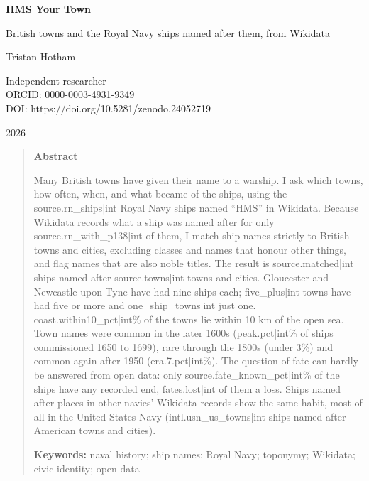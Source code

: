 \documentclass[11pt,a4paper]{article}
\begin{document}
\begin{center}
{\Large\bfseries HMS Your Town\par}
\vspace{0.4em}
{\large British towns and the Royal Navy ships named after them, from Wikidata\par}
\vspace{1.2em}
{\large Tristan Hotham\par}
\vspace{0.3em}
{\small Independent researcher\\
ORCID: 0000-0003-4931-9349\\
DOI: https://doi.org/10.5281/zenodo.24052719\par}
\vspace{0.8em}
2026
\end{center}

\begin{quote}
\small
\begin{center}\textbf{Abstract}\end{center}
Many British towns have given their name to a warship. I ask which towns, how often, when, and what became of the ships, using the {{source.rn_ships|int}} Royal Navy ships named ``HMS'' in Wikidata. Because Wikidata records what a ship was named after for only {{source.rn_with_p138|int}} of them, I match ship names strictly to British towns and cities, excluding classes and names that honour other things, and flag names that are also noble titles. The result is {{source.matched|int}} ships named after {{source.towns|int}} towns and cities. Gloucester and Newcastle upon Tyne have had nine ships each; {{five_plus|int}} towns have had five or more and {{one_ship_towns|int}} just one. {{coast.within10_pct|int}}\% of the towns lie within 10 km of the open sea. Town names were common in the later 1600s ({{peak.pct|int}}\% of ships commissioned 1650 to 1699), rare through the 1800s (under 3\%) and common again after 1950 ({{era.7.pct|int}}\%). The question of fate can hardly be answered from open data: only {{source.fate_known_pct|int}}\% of the ships have any recorded end, {{fates.lost|int}} of them a loss. Ships named after places in other navies' Wikidata records show the same habit, most of all in the United States Navy ({{intl.usn_us_towns|int}} ships named after American towns and cities).

\textbf{Keywords:} naval history; ship names; Royal Navy; toponymy; Wikidata; civic identity; open data
\end{quote}
\end{document}
